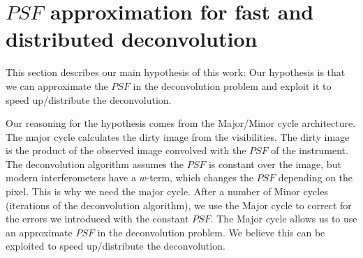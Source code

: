 \section{$PSF$ approximation for fast and distributed deconvolution} \label{gradients}
This section describes our main hypothesis of this work: Our hypothesis is that we can approximate the $PSF$ in the deconvolution problem and exploit it to speed up/distribute the deconvolution.

Our reasoning for the hypothesis comes from the Major/Minor cycle architecture. The major cycle calculates the dirty image from the visibilities. The dirty image is the product of the observed image convolved with the $PSF$ of the instrument. The deconvolution algorithm assumes the $PSF$ is constant over the image, but modern interferometers have a $w$-term, which changes the $PSF$ depending on the pixel. This is why we need the major cycle. After a number of Minor cycles (iterations of the deconvolution algorithm), we use the Major cycle to correct for the errors we introduced with the constant $PSF$. The Major cycle allows us to use an approximate $PSF$ in the deconvolution problem. We believe this can be exploited to speed up/distribute the deconvolution.

